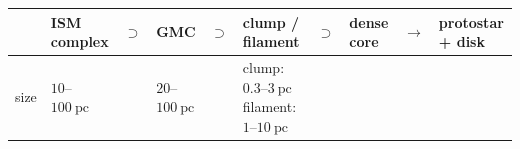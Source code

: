 \documentclass[11pt]{article}
\begin{document}
\begin{longtable}[]{@{}
  >{\raggedright\arraybackslash}p{}
  >{\raggedright\arraybackslash}p{}
  >{\centering\arraybackslash}p{}
  >{\raggedright\arraybackslash}p{}
  >{\centering\arraybackslash}p{}
  >{\raggedright\arraybackslash}p{}
  >{\centering\arraybackslash}p{}
  >{\raggedright\arraybackslash}p{}
  >{\centering\arraybackslash}p{}
  >{\raggedright\arraybackslash}p{}@{}}
\toprule\noalign{}
\begin{minipage}[b]{\linewidth}\raggedright
\end{minipage} & \begin{minipage}[b]{\linewidth}\raggedright
ISM complex
\end{minipage} & \begin{minipage}[b]{\linewidth}\centering
\(\supset\)
\end{minipage} & \begin{minipage}[b]{\linewidth}\raggedright
GMC
\end{minipage} & \begin{minipage}[b]{\linewidth}\centering
\(\supset\)
\end{minipage} & \begin{minipage}[b]{\linewidth}\raggedright
clump / filament
\end{minipage} & \begin{minipage}[b]{\linewidth}\centering
\(\supset\)
\end{minipage} & \begin{minipage}[b]{\linewidth}\raggedright
dense core
\end{minipage} & \begin{minipage}[b]{\linewidth}\centering
\(\to\)
\end{minipage} & \begin{minipage}[b]{\linewidth}\raggedright
protostar + disk
\end{minipage} \\
\midrule\noalign{}
\endhead
\bottomrule\noalign{}
\endlastfoot
size & \(10\)--\(100\ \mathrm{pc}\) & & \(20\)--\(100\ \mathrm{pc}\) & &
clump: \(0.3\)--\(3\ \mathrm{pc}\) filament: \(1\)--\(10\ \mathrm{pc}\)

\end{longtable}
\end{document}
